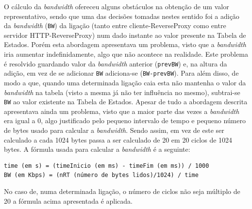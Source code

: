 \documentclass{article}
\begin{document}
O cálculo da \textit{bandwidth} ofereceu alguns obstáculos na obtenção de um valor representativo, sendo que uma das decisões tomadas nestes sentido foi a adição da \textit{bandwidth} (\texttt{BW}) da ligação (tanto entre cliente-ReverseProxy como entre servidor HTTP-ReverseProxy) num dado instante ao valor presente na Tabela de Estados. Porém esta abordagem apresentava um problema, visto que a \textit{bandwidth} iria aumentar indefinidamente, algo que não acontece na realidade. Este problema é resolvido guardando valor da \textit{bandwidth} anterior (\texttt{prevBW}) e, na altura da adição, em vez de se adicionar \texttt{BW} adiciona-se (\texttt{BW-prevBW}). Para além disso, de modo a que, quando uma determinada ligação caia esta não mantenha o valor da \textit{bandwidth} na tabela (visto a mesma já não ter influência no mesmo), subtrai-se \texttt{BW} ao valor existente na Tabela de Estados. Apesar de tudo a abordagem descrita apresentava ainda um problema, visto que a maior parte das vezes a \textit{bandwidth} era igual a 0, algo justificado pelo pequeno intervalo de tempo e pequeno número de bytes usado para calcular a \textit{bandwidth}. Sendo assim, em vez de este ser calculado a cada 1024 bytes passa a ser calculado de 20 em 20 ciclos de 1024 bytes. A fórmula usada para calcular a \textit{bandwidth} é a seguinte:
\begin{verbatim}
time (em s) = (timeInicio (em ms) - timeFim (em ms)) / 1000
BW (em Kbps) = (nRT (número de bytes lidos)/1024) / time
\end{verbatim}
No caso de, numa determinada ligação, o número de ciclos  não seja múltiplo de 20 a fórmula acima apresentada é aplicada.
\end{document}

